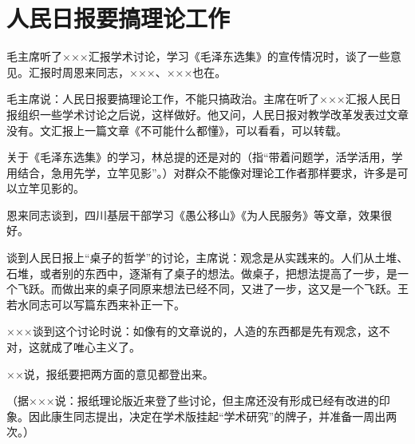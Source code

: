 \section[人民日报要搞理论工作（一九六四年三月二十二日）]{人民日报要搞理论工作}


毛主席听了×××汇报学术讨论，学习《毛泽东选集》的宣传情况时，谈了一些意见。汇报时周恩来同志，×××、×××也在。

毛主席说：人民日报要搞理论工作，不能只搞政治。主席在听了×××汇报人民日报组织一些学术讨论之后说，这样做好。他又问，人民日报对教学改革发表过文章没有。文汇报上一篇文章《不可能什么都懂》，可以看看，可以转载。

关于《毛泽东选集》的学习，林总提的还是对的（指“带着问题学，活学活用，学用结合，急用先学，立竿见影”。）对群众不能像对理论工作者那样要求，许多是可以立竿见影的。

恩来同志谈到，四川基层干部学习《愚公移山》《为人民服务》等文章，效果很好。

谈到人民日报上“桌子的哲学”的讨论，主席说：观念是从实践来的。人们从土堆、石堆，或者别的东西中，逐渐有了桌子的想法。做桌子，把想法提高了一步，是一个飞跃。而做出来的桌子同原来想法已经不同，又进了一步，这又是一个飞跃。王若水同志可以写篇东西来补正一下。

×××谈到这个讨论时说：如像有的文章说的，人造的东西都是先有观念，这不对，这就成了唯心主义了。

××说，报纸要把两方面的意见都登出来。

（据×××说：报纸理论版近来登了些讨论，但主席还没有形成已经有改进的印象。因此康生同志提出，决定在学术版挂起“学术研究”的牌子，并准备一周出两次。）


